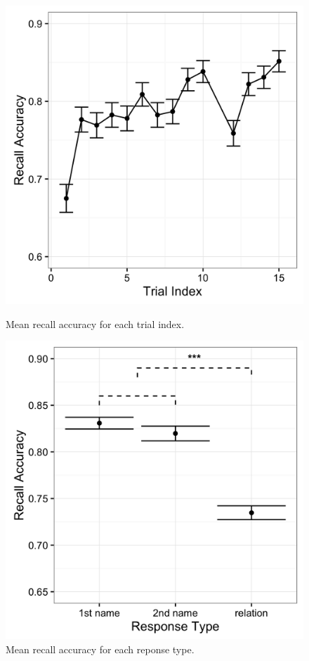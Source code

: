 \documentclass[a4paper,man,natbib,floatsintext,import]{apa6}
\begin{document}
\begin{figure}
\begin{minipage}[t]{.5\textwidth}
\includegraphics[width=.9\linewidth]{figures/conf_stoidx.png}
\caption{Mean recall accuracy for each trial index.}
\label{fig:conf_stoidx}
\end{minipage}
\begin{minipage}[t]{.5\textwidth}
\includegraphics[width=.9\linewidth]{figures/conf_respType.png}
\caption{Mean recall accuracy for each reponse type.}
\label{fig:conf_respType}
\end{minipage}
\end{figure}
\end{document}
